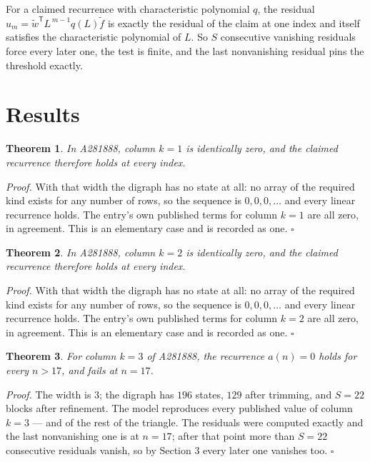 \documentclass[11pt]{article}
\newtheorem{theorem}{Theorem}
\theoremstyle{definition}
\begin{document}
For a claimed recurrence with characteristic polynomial $q$, the residual $u_m = \tilde w^{\mathsf T}L^{\,m-1}q(L)\tilde f$ is exactly the residual of the claim at one index and itself satisfies the characteristic polynomial of $L$. So $S$ consecutive vanishing residuals force every later one, the test is finite, and the last nonvanishing residual pins the threshold exactly.

\section{Results}

\begin{theorem} In A281888, column $k = 1$ is identically zero, and the claimed recurrence therefore holds at every index.\end{theorem}

{\itshape Proof.} With that width the digraph has no state at all: no array of the required kind exists for any number of rows, so the sequence is $0,0,0,\dots$ and every linear recurrence holds. The entry's own published terms for column $k = 1$ are all zero, in agreement. This is an elementary case and is recorded as one. $\square$

\begin{theorem} In A281888, column $k = 2$ is identically zero, and the claimed recurrence therefore holds at every index.\end{theorem}

{\itshape Proof.} With that width the digraph has no state at all: no array of the required kind exists for any number of rows, so the sequence is $0,0,0,\dots$ and every linear recurrence holds. The entry's own published terms for column $k = 2$ are all zero, in agreement. This is an elementary case and is recorded as one. $\square$

\begin{theorem} For column $k = 3$ of A281888, the recurrence $a(n) = 0$ holds for every $n > 17$, and fails at $n = 17$.\end{theorem}

{\itshape Proof.} The width is $3$; the digraph has $196$ states, $129$ after trimming, and $S = 22$ blocks after refinement. The model reproduces every published value of column $k = 3$ --- and of the rest of the triangle. The residuals were computed exactly and the last nonvanishing one is at $n = 17$; after that point more than $S = 22$ consecutive residuals vanish, so by Section 3 every later one vanishes too. $\square$
\end{document}
